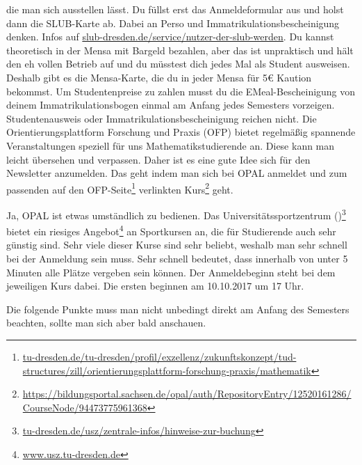 \documentclass{scrartcl}
\begin{document}
\begin{description}
    die man sich ausstellen lässt. Du füllst erst das Anmeldeformular aus und holst dann die SLUB-Karte ab. Dabei an Perso und Immatrikulationsbescheinigung denken. Infos auf \url{slub-dresden.de/service/nutzer-der-slub-werden}.
   Du kannst theoretisch in der Mensa mit Bargeld bezahlen,
    aber das ist unpraktisch und hält den eh vollen Betrieb auf und
    du müsstest dich jedes Mal als Student ausweisen.
    Deshalb gibt es die Mensa-Karte,
    die du in jeder Mensa für 5€ Kaution bekommst.
    Um Studentenpreise zu zahlen musst du die EMeal-Bescheinigung von deinem Immatrikulationsbogen
    einmal am Anfang jedes Semesters vorzeigen.
    Studentenausweis oder Immatrikulationsbescheinigung reichen nicht.
   Die Orientierungsplattform Forschung und Praxis (OFP) bietet regelmäßig spannende Veranstaltungen
    speziell für uns Mathematikstudierende an.
    Diese kann man leicht übersehen und verpassen.
    Daher ist es eine gute Idee sich für den Newsletter anzumelden.
    Das geht indem man sich bei OPAL anmeldet und zum passenden auf den
    OFP-Seite\footnote{\url{tu-dresden.de/tu-dresden/profil/exzellenz/zukunftskonzept/tud-structures/zill/orientierungsplattform-forschung-praxis/mathematik}}
    verlinkten Kurs\footnote{\url{https://bildungsportal.sachsen.de/opal/auth/RepositoryEntry/12520161286/CourseNode/94473775961368}} geht.
    
    Ja, OPAL ist etwas umständlich zu bedienen.
     Das Universitätssportzentrum ()\footnote{\url{tu-dresden.de/usz/zentrale-infos/hinweise-zur-buchung}} bietet ein riesiges Angebot\footnote{\url{www.usz.tu-dresden.de}} an
    Sportkursen an, die für Studierende auch sehr günstig sind.
    Sehr viele dieser Kurse sind sehr beliebt, weshalb man sehr schnell bei der Anmeldung sein muss.
    Sehr schnell bedeutet, dass innerhalb von unter 5 Minuten alle Plätze vergeben sein können.
    Der Anmeldebeginn steht bei dem jeweiligen Kurs dabei. Die ersten beginnen am 10.10.2017 um 17 Uhr.
\end{description}
Die folgende Punkte muss man nicht unbedingt direkt am Anfang des Semesters beachten, sollte man
sich aber bald anschauen.
\end{document}
